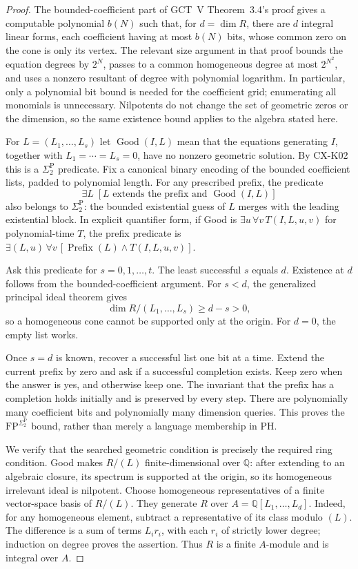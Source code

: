 \documentclass[11pt,a4paper]{article}
\begin{document}
\begin{proof}
The bounded-coefficient part of GCT~V Theorem~3.4's proof gives a
computable polynomial $b(N)$ such that, for $d=\dim R$, there are
$d$ integral linear forms, each coefficient having at most $b(N)$
bits, whose common zero on the cone is only its vertex. The relevant
size argument in that proof bounds the equation degrees by $2^N$,
passes to a common homogeneous degree at most $2^{N^2}$, and uses a
nonzero resultant of degree with polynomial logarithm. In particular,
only a polynomial bit bound is needed for the coefficient grid;
enumerating all monomials is unnecessary. Nilpotents do not change
the set of geometric zeros or the dimension, so the same existence
bound applies to the algebra stated here.

For $L=(L_1,\ldots,L_s)$ let $\operatorname{Good}(I,L)$ mean that
the equations generating $I$, together with $L_1=\cdots=L_s=0$,
have no nonzero geometric solution. By CX-K02 this is a
$\Sigma_2^{\mathrm P}$ predicate. Fix a canonical binary encoding
of the bounded coefficient lists, padded to polynomial length. For
any prescribed prefix, the predicate
\[
 \exists L\;[\text{$L$ extends the prefix and }
                    \operatorname{Good}(I,L)]
\]
also belongs to $\Sigma_2^{\mathrm P}$: the bounded existential
guess of $L$ merges with the leading existential block. In explicit
quantifier form, if Good is $\exists u\,\forall v\,T(I,L,u,v)$
for polynomial-time $T$, the prefix predicate is
$\exists (L,u)\,\forall v\,[\operatorname{Prefix}(L)\land
T(I,L,u,v)]$.

Ask this predicate for $s=0,1,\ldots,t$. The least successful $s$
equals $d$. Existence at $d$ follows from the bounded-coefficient
argument. For $s<d$, the generalized principal ideal theorem gives
\[
 \dim R/(L_1,\ldots,L_s)\ge d-s>0,
\]
so a homogeneous cone cannot be supported only at the origin.
For $d=0$, the empty list works.

Once $s=d$ is known, recover a successful list one bit at a time.
Extend the current prefix by zero and ask if a successful completion
exists. Keep zero when the answer is yes, and otherwise keep one.
The invariant that the prefix has a completion holds initially and
is preserved by every step. There are polynomially many coefficient
bits and polynomially many dimension queries. This proves the
$\mathrm{FP}^{\Sigma_2^{\mathrm P}}$ bound, rather than merely a
language membership in PH.

We verify that the searched geometric condition is precisely the
required ring condition. Good makes $R/(L)$ finite-dimensional over
$\mathbb Q$: after extending to an algebraic closure, its spectrum is
supported at the origin, so its homogeneous irrelevant ideal is
nilpotent. Choose homogeneous representatives of a finite vector-space
basis of $R/(L)$. They generate $R$ over
$A=\mathbb Q[L_1,\ldots,L_d]$. Indeed, for any homogeneous element,
subtract a representative of its class modulo $(L)$. The difference
is a sum of terms $L_i r_i$, with each $r_i$ of strictly lower degree;
induction on degree proves the assertion. Thus $R$ is a finite
$A$-module and is integral over $A$.


\end{proof}
\end{document}
